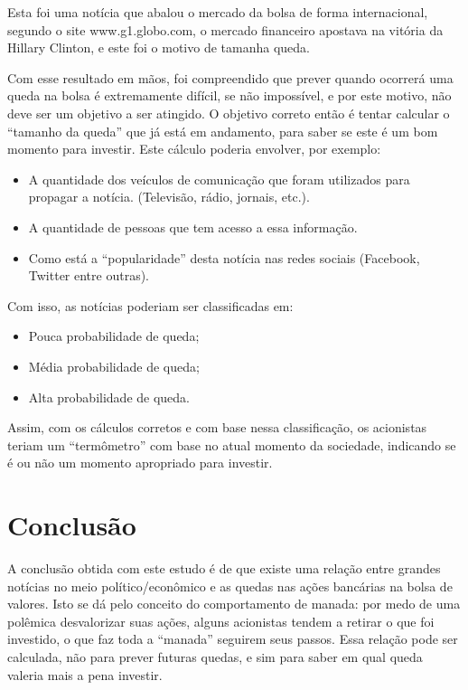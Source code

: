 \documentclass{sigchi}
\begin{document}
Esta foi uma notícia que abalou o mercado da bolsa de forma internacional, segundo o site www.g1.globo.com, o mercado financeiro apostava na vitória da Hillary Clinton, e este foi o motivo de tamanha queda. 

Com esse resultado em mãos, foi compreendido que prever quando ocorrerá uma queda na bolsa é extremamente difícil, se não impossível, e por este motivo, não deve ser um objetivo a ser atingido. O objetivo correto então é tentar calcular o “tamanho da queda” que já está em andamento, para saber se este é um bom momento para investir. Este cálculo poderia envolver, por exemplo:
\begin{itemize}
\item A quantidade dos veículos de comunicação que foram utilizados para propagar a notícia. (Televisão, rádio, jornais, etc.).

\item A quantidade de pessoas que tem acesso a essa informação.

\item Como está a “popularidade” desta notícia nas redes sociais (Facebook, Twitter entre outras).

\end{itemize}


Com isso, as notícias poderiam ser classificadas em: 
\begin{itemize}
	\item Pouca probabilidade de queda;
	\item Média probabilidade de queda;
	\item Alta probabilidade de queda.
\end{itemize}



Assim, com os cálculos corretos e com base nessa classificação, os acionistas teriam um “termômetro” com base no atual momento da sociedade, indicando se é ou não um momento apropriado para investir.

\section{Conclusão}

A conclusão obtida com este estudo é de que existe uma relação entre grandes notícias no meio político/econômico e as quedas nas ações bancárias na bolsa de valores. Isto se dá pelo conceito do comportamento de manada: por medo de uma polêmica desvalorizar suas ações, alguns acionistas tendem a retirar o que foi investido, o que faz toda a “manada” seguirem seus passos. Essa relação pode ser calculada, não para prever futuras quedas, e sim para saber em qual queda valeria mais a pena investir.


\balance{}



\end{document}

